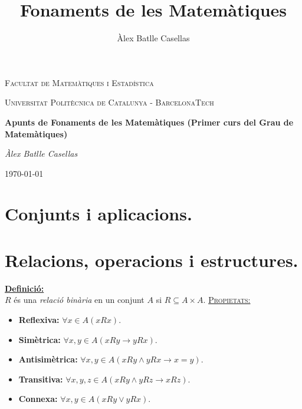 \documentclass[11pt]{article}
\title{Fonaments de les Matemàtiques}
\author{Àlex Batlle Casellas}
\newcommand{\propietats}{\underline{{\scshape Propietats:}}}
\newcommand{\definicio}{\underline{\textbf{Definició:}}\\}
\begin{document}
\begin{titlepage}
	\centering
	{\scshape\LARGE Facultat de Matemàtiques i Estadística \par}
	\vspace{1cm}
	{\scshape\Large Universitat Politècnica de Catalunya - BarcelonaTech\par}
	\vspace{1.5cm}
	{\huge\bfseries Apunts de Fonaments de les Matemàtiques (Primer curs del Grau de Matemàtiques)
	\par}
	\vspace{2cm}
	{\Large\itshape Àlex Batlle Casellas\par}

	\vfill

	{\large \today\par}
\end{titlepage}


\vfill
\newpage

\tableofcontents
\newpage
\section{}
\section{Conjunts i aplicacions.}
\section{Relacions, operacions i estructures.}
\definicio $R$ és una \textit{relació binària} en un conjunt $A$ si $R\subseteq A\times A$.
\propietats \begin{itemize}
	\item \textbf{Reflexiva:} $\forall x\in A (xRx)$.
	\item \textbf{Simètrica:} $\forall x,y\in A (xRy \rightarrow yRx)$.
	\item \textbf{Antisimètrica:} $\forall x,y\in A (xRy\wedge yRx\rightarrow x=y)$.
	\item \textbf{Transitiva:} $\forall x,y,z\in A (xRy\wedge yRz\rightarrow xRz)$.
	\item \textbf{Connexa:} $\forall x,y\in A (xRy\vee yRx)$.
\end{itemize}
\end{document}
